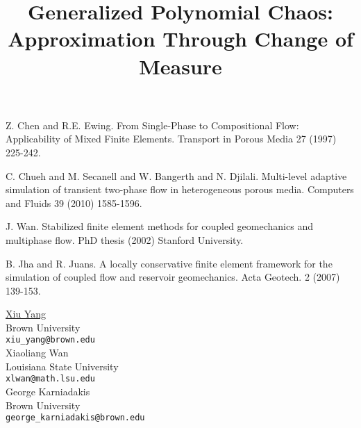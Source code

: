 \documentclass[article,A4,11pt]{llncs}%
\begin{document}

\begin{thebibliography}{10}
{\sc Z. Chen and R.E. Ewing}. {From Single-Phase to Compositional Flow: Applicability of Mixed Finite Elements}. Transport in Porous Media 27 (1997) 225-242.

{\sc C. Chueh and M. Secanell and W. Bangerth and N. Djilali}. {Multi-level adaptive simulation of transient two-phase flow in heterogeneous porous media}. Computers and Fluids 39 (2010) 1585-1596.

{\sc J. Wan}. {Stabilized finite element methods for coupled geomechanics and multiphase flow}. PhD thesis (2002) Stanford University.

{\sc B. Jha and R. Juans}. {A locally conservative finite element framework for the simulation of coupled flow and reservoir geomechanics}. Acta Geotech. 2 (2007) 139-153.
\end{thebibliography}

\title{Generalized Polynomial Chaos: Approximation Through Change of Measure}
 \author{} \institute{}
\maketitle
\begin{center}
{\large \underline{Xiu Yang}}\\
Brown University\\
{\tt xiu\_yang@brown.edu}
\\ \vspace{4mm}
{\large Xiaoliang Wan}\\
Louisiana State University\\
{\tt xlwan@math.lsu.edu}
\\ \vspace{4mm}
{\large George  Karniadakis}\\
Brown University\\
{\tt george\_karniadakis@brown.edu}
\end{center}
\end{document}
